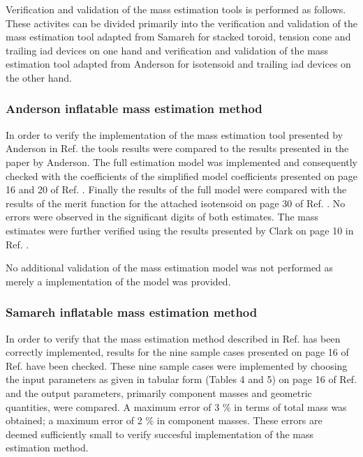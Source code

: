Verification and validation of the mass estimation tools is performed as follows. These activites can be divided primarily into the verification and validation of the mass estimation tool adapted from Samareh \cite{Samareh2011} for stacked toroid, tension cone and trailing \gls{iad} devices on one hand and verification and validation of the mass estimation tool adapted from Anderson \cite{Anderson1969} for isotensoid and trailing \gls{iad} devices on the other hand. 

\subsubsection{Anderson inflatable mass estimation method}
In order to verify the implementation of the mass estimation tool presented by Anderson in Ref. \cite{Anderson1969} the tools results were compared to the results presented in the paper by Anderson. The full estimation model was implemented and consequently checked with the coefficients of the simplified model coefficients presented on page 16 and 20 of Ref. \cite{Anderson1969}. Finally the results of the full model were compared with the results of the merit function for the attached isotensoid on page 30 of Ref. \cite{Anderson1969}. No errors were observed in the significant digits of both estimates. The mass estimates were further verified using the results presented by Clark on page 10 in Ref. \cite{Clark2009}.

No additional validation of the mass estimation model was not performed as merely a implementation of the model was provided. 


\subsubsection{Samareh inflatable mass estimation method}
In order to verify that the mass estimation method described in Ref.\cite{Samareh2011} has been correctly implemented, results for the nine sample cases presented on page 16 of Ref.\cite{Samareh2011} have been checked. These nine sample cases were implemented by choosing the input parameters as given in tabular form (Tables 4 and 5) on page 16 of Ref.\cite{Samareh2011} and the output parameters, primarily component masses and geometric quantities, were compared. A maximum error of 3 $\%$ in terms of total mass was obtained; a maximum error of 2 $\%$ in component masses. These errors are deemed sufficiently small to verify succesful implementation of the mass estimation method.

